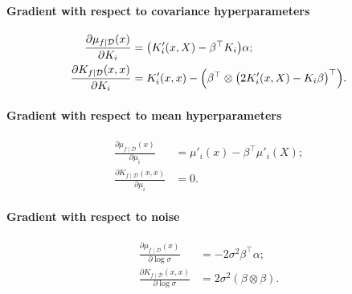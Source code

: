 \documentclass{article}
\newcommand{\given}{\mid}
\newcommand{\cm}[1]{\mathcal{#1}}
\newcommand{\data}{\cm{D}}
\newcommand{\trans}{^{\top}}
\begin{document}
\paragraph{Gradient with respect to covariance hyperparameters}

\begin{align*}
  \frac{\partial \mu_{f \given \data}(x)}{\partial K_i}
  &=
  \bigl(K'_i(x, X) - \beta\trans K_i\bigr)\alpha;
  \\
  \frac{\partial K_{f \given \data}(x, x)}{\partial K_i}
  &=
  K'_i(x, x) -
  \Bigl(
  \beta\trans
  \otimes
  \bigl(
  2 K'_i(x, X) - K_i \beta
  \bigr)\trans
  \Bigr).
\end{align*}

\paragraph{Gradient with respect to mean hyperparameters}

\begin{align*}
  \frac{\partial \mu_{f \given \data}(x)}{\partial \mu_i}
  &=
  \mu'_i(x)
  -
  \beta\trans \mu'_i(X);
  \\
  \frac{\partial K_{f \given \data}(x, x)}{\partial \mu_i}
  &=
  0.
\end{align*}

\paragraph{Gradient with respect to noise}

\begin{align*}
  \frac{\partial \mu_{f \given \data}(x)}{\partial \log \sigma}
  &=
  -2\sigma^2 \beta\trans \alpha;
  \\
  \frac{\partial K_{f \given \data}(x, x)}{\partial \log \sigma}
  &=
  2\sigma^2 (\beta \otimes \beta).
\end{align*}
\end{document}
